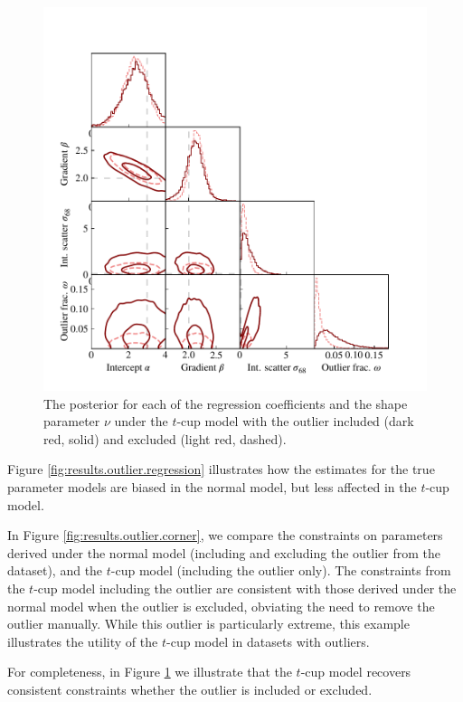 \documentclass[fleqn,usenatbib]{mnras}
\begin{document}
\begin{figure}
    \includegraphics[width=\columnwidth]{graphics/corner_outlier_tcup.pdf}
    \caption{The posterior for each of the regression coefficients and the shape
    parameter $\nu$ under the $t$-cup model with the outlier included (dark red,
    solid) and excluded (light red, dashed).}
    \label{fig:results.outlier.tcup}
\end{figure}

Figure \ref{fig:results.outlier.regression} illustrates how the estimates for
the true parameter models are biased in the normal model, but less affected in
the $t$-cup model.

In Figure \ref{fig:results.outlier.corner}, we compare the constraints on
parameters derived under the normal model (including and excluding the outlier
from the dataset), and the $t$-cup model (including the outlier only). The
constraints from the $t$-cup model including the outlier are consistent with
those derived under the normal model when the outlier is excluded, obviating the
need to remove the outlier manually. While this outlier is particularly extreme,
this example illustrates the utility of the $t$-cup model in datasets with
outliers.

For completeness, in Figure \ref{fig:results.outlier.tcup} we illustrate that
the $t$-cup model recovers consistent constraints whether the outlier is
included or excluded.
\end{document}
